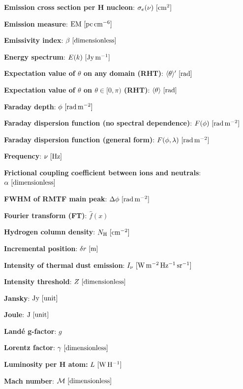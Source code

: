 \documentclass[a4paper,10pt]{article}
\begin{document}
{\noindent}\textbf{Emission cross section per H nucleon}: $\sigma_e(\nu) ~ [{\rm cm^2}]$

{\noindent}\textbf{Emission measure}: ${\rm EM} ~ [{\rm pc\,cm^{-6}}]$

{\noindent}\textbf{Emissivity index}: $\beta ~ [{\rm dimensionless}]$

{\noindent}\textbf{Energy spectrum}: $E(k)~[{\rm Jy\,m^{-1}}]$

{\noindent}\textbf{Expectation value of $\theta$ on any domain (RHT)}: $\langle\theta\rangle' ~ [{\rm rad}]$

{\noindent}\textbf{Expectation value of $\theta$ on $\theta\in[0,\pi)$ (RHT)}: $\langle\theta\rangle ~ [{\rm rad}]$

{\noindent}\textbf{Faraday depth}: $\phi~[{\rm rad\,m^{-2}}]$

{\noindent}\textbf{Faraday dispersion function (no spectral dependence)}: $F(\phi)~[{\rm rad\,m^{-2}}]$

{\noindent}\textbf{Faraday dispersion function (general form)}: $F(\phi,\lambda)~[{\rm rad\,m^{-2}}]$

{\noindent}\textbf{Frequency}: $\nu~[{\rm Hz}]$

{\noindent}\textbf{Frictional coupling coefficient between ions and neutrals}: $\alpha~[{\rm dimensionless}]$

{\noindent}\textbf{FWHM of RMTF main peak}: $\Delta\phi~[{\rm rad\,m^{-2}}]$

{\noindent}\textbf{Fourier transform (FT)}: $\hat{f}(x)$

{\noindent}\textbf{Hydrogen column density}: $N_{\rm H} ~ [{\rm cm^{-2}}]$

{\noindent}\textbf{Incremental position}: $\delta r~[{\rm m}]$

{\noindent}\textbf{Intensity of thermal dust emission}: $I_\nu~ [{\rm W\,m^{-2}\,Hz^{-1}\,sr^{-1}}]$

{\noindent}\textbf{Intensity threshold}: $Z ~ [{\rm dimensionless}]$

{\noindent}\textbf{Jansky}: $\mathrm{Jy} ~ [\rm unit]$

{\noindent}\textbf{Joule}: $\mathrm{J} ~ [\rm unit]$

{\noindent}\textbf{Land\'e g-factor}: $g$

{\noindent}\textbf{Lorentz factor}: $\gamma ~ [\rm dimensionless]$

{\noindent}\textbf{Luminosity per H atom:} $L ~ [{\rm W\,H^{-1}}]$

{\noindent}\textbf{Mach number}: $\mathcal{M}~[{\rm dimensionless]}$
\end{document}
